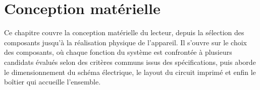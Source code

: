 \chapter{Conception matérielle}
\label{chap:hardware}

Ce chapitre couvre la conception matérielle du lecteur, depuis la sélection des composants jusqu'à la réalisation physique de l'appareil. Il s'ouvre sur le choix des composants, où chaque fonction du système est confrontée à plusieurs candidats évalués selon des critères communs issus des spécifications, puis aborde le dimensionnement du schéma électrique, le layout du circuit imprimé et enfin le boîtier qui accueille l'ensemble.

